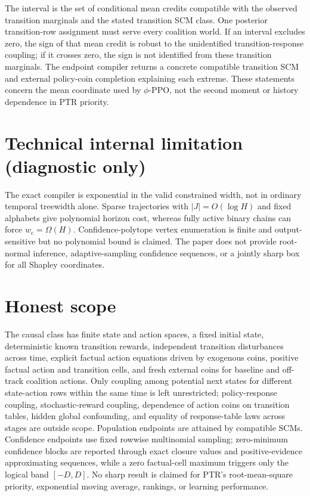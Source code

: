 \documentclass{article}
\begin{document}
The interval is the set of conditional mean credits compatible with the observed transition marginals and the stated transition SCM class.  One posterior transition-row assignment must serve every coalition world.  If an interval excludes zero, the sign of that mean credit is robust to the unidentified transition-response coupling; if it crosses zero, the sign is not identified from these transition marginals.  The endpoint compiler returns a concrete compatible transition SCM and external policy-coin completion explaining each extreme.  These statements concern the mean coordinate used by \(\phi\)-PPO, not the second moment or history dependence in PTR priority.

\section*{Technical internal limitation (diagnostic only)}

The exact compiler is exponential in the valid constrained width, not in ordinary temporal treewidth alone.  Sparse trajectories with \(|J|=O(\log H)\) and fixed alphabets give polynomial horizon cost, whereas fully active binary chains can force \(w_{\mathrm c}=\Omega(H)\).  Confidence-polytope vertex enumeration is finite and output-sensitive but no polynomial bound is claimed.  The paper does not provide root-normal inference, adaptive-sampling confidence sequences, or a jointly sharp box for all Shapley coordinates.

\section{Honest scope}

The causal class has finite state and action spaces, a fixed initial state, deterministic known transition rewards, independent transition disturbances across time, explicit factual action equations driven by exogenous coins, positive factual action and transition cells, and fresh external coins for baseline and off-track coalition actions.  Only coupling among potential next states for different state-action rows within the same time is left unrestricted; policy-response coupling, stochastic-reward coupling, dependence of action coins on transition tables, hidden global confounding, and equality of response-table laws across stages are outside scope.  Population endpoints are attained by compatible SCMs.  Confidence endpoints use fixed rowwise multinomial sampling; zero-minimum confidence blocks are reported through exact closure values and positive-evidence approximating sequences, while a zero factual-cell maximum triggers only the logical band \([-D,D]\).  No sharp result is claimed for PTR's root-mean-square priority, exponential moving average, rankings, or learning performance.
\end{document}
